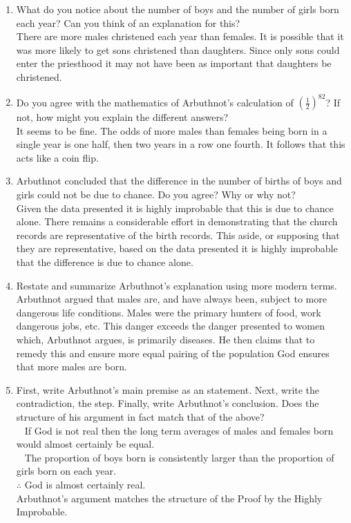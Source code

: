 \documentclass[a4paper, 12pt]{../../config/homework}
\begin{document}
\begin{enumerate}[label=\textbf{Task \arabic*}]
\item What do you notice about the number of boys and the number of girls born each year? Can you think of an explanation for this?
\\ There are more males christened each year than females. It is possible that it was more likely to get sons christened than daughters. Since only sons could enter the priesthood it may not have been as important that daughters be christened.

\pagebreak
\item Do you agree with the mathematics of Arbuthnot's calculation of \({\left(\frac{1}{2}\right)}^{82}\)? If not, how might you explain the different answers?
\\ It seems to be fine. The odds of more males than females being born in a single year is one half, then two years in a row one fourth. It follows that this acts like a coin flip.

\item Arbuthnot concluded that the difference in the number of births of boys and girls could not be due to chance. Do you agree? Why or why not?
\\ Given the data presented it is highly improbable that this is due to chance alone. There remains a considerable effort in demonstrating that the church records are representative of the birth records. This aside, or supposing that they are representative, based on the data presented it is highly improbable that the difference is due to chance alone.

\item Restate and summarize Arbuthnot's explanation using more modern terms.
\\ Arbuthnot argued that males are, and have always been, subject to more dangerous life conditions. Males were the primary hunters of food, work dangerous jobs, etc. This danger exceeds the danger presented to women which, Arbuthnot argues, is primarily diseases. He then claims that to remedy this and ensure more equal pairing of the population God ensures that more males are born.

\item First, write Arbuthnot's main premise as an  statement. Next, write the contradiction, the  step. Finally, write Arbuthnot's conclusion. Does the structure of his argument in fact match that of the  above?
\\ \(\phantom{\therefore}\) If God is not real then the long term averages of males and females born would almost certainly be equal.
\\ \(\phantom{\therefore}\) The proportion of boys born is consistently larger than the proportion of girls born on each year.
\\ \(\therefore \) God is almost certainly real.
\\ Arbuthnot's argument matches the structure of the Proof by the Highly Improbable.


\end{enumerate}
\end{document}
